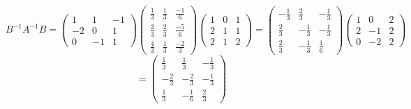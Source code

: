 \documentclass[12pt]{article}
\begin{document}
$$B^{-1}A^{-1}B = \begin{pmatrix} 1 & 1 & -1 \\ -2 & 0 & 1 \\ 0 & -1 & 1\end{pmatrix} \begin{pmatrix} \frac{1}{3} & \frac{1}{3} & \frac{-1}{6} \\ \frac{2}{3} & \frac{2}{3} & \frac{-5}{6} \\ \frac{4}{3} & \frac{1}{3} & \frac{-2}{3} \end{pmatrix} \begin{pmatrix} 1 & 0 & 1 \\ 2 & 1 & 1 \\ 2 & 1 & 2 \end{pmatrix}= \begin{pmatrix} -\frac{1}{3} & \frac{2}{3} & -\frac{1}{3} \\ \frac{2}{3} & -\frac{1}{3} & -\frac{1}{3} \\ \frac{2}{3} & -\frac{1}{3} & \frac{1}{6}\end{pmatrix}\begin{pmatrix} 1 & 0 & 2 \\ 2 & -1 & 2 \\ 0 & -2 & 2\end{pmatrix}$$ 
$$ = \begin{pmatrix} \frac{1}{3} & \frac{1}{3} & -\frac{1}{3} \\ -\frac{2}{3} & -\frac{2}{3} & -\frac{1}{3} \\ \frac{1}{3} & -\frac{1}{6} & \frac{2}{3}\end{pmatrix}$$
\end{document}
